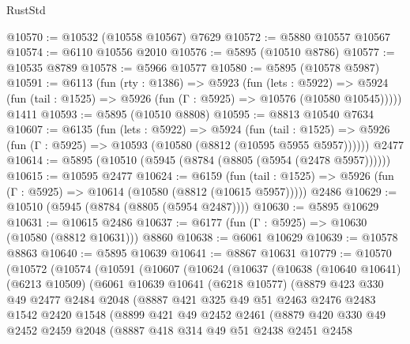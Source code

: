 \begin{lexlean}{RustStd}
\begin{coremodule}
{\begin{coremodule}
{{{{{{{{{{{{{{{{{{{{{{{{{{{{{{{{{{{@10570 := @10532 (@10558 @10567) @7629
@10572 := @5880 @10557 @10567
@10574 := @6110 @10556 @2010
@10576 := @5895 (@10510 @8786)
@10577 := @10535 @8789
@10578 := @5966 @10577
@10580 := @5895 (@10578 @5987)
@10591 := @6113
    (fun (rty : @1386) =>
    @5923
      (fun (lets : @5922) =>
      @5924 (fun (tail : @1525) => @5926 (fun (Γ : @5925) => @10576 (@10580 @10545)))))
    @1411
@10593 := @5895 (@10510 @8808)
@10595 := @8813 @10540 @7634
@10607 := @6135
    (fun (lets : @5922) =>
    @5924
      (fun (tail : @1525) =>
      @5926 (fun (Γ : @5925) => @10593 (@10580 (@8812 (@10595 @5955 @5957))))))
    @2477
@10614 := @5895 (@10510 (@5945 (@8784 (@8805 (@5954 (@2478 @5957))))))
@10615 := @10595 @2477
@10624 := @6159
    (fun (tail : @1525) => @5926 (fun (Γ : @5925) => @10614 (@10580 (@8812 (@10615 @5957)))))
    @2486
@10629 := @10510 (@5945 (@8784 (@8805 (@5954 @2487))))
@10630 := @5895 @10629
@10631 := @10615 @2486
@10637 := @6177 (fun (Γ : @5925) => @10630 (@10580 (@8812 @10631))) @8860
@10638 := @6061 @10629
@10639 := @10578 @8863
@10640 := @5895 @10639
@10641 := @8867 @10631
@10779 := @10570
    (@10572
      (@10574
        (@10591
          (@10607
            (@10624
              (@10637
                (@10638
                  (@10640 @10641)
                  (@6213 @10509)
                  (@6061
                    @10639
                    @10641
                    (@6218 @10577)
                    (@8879
                      @423
                      @330
                      @49
                      @2477
                      @2484
                      @2048
                      (@8887
                        @421
                        @325
                        @49
                        @51
                        @2463
                        @2476
                        @2483
                        @1542
                        @2420
                        @1548
                        (@8899
                          @421
                          @49
                          @2452
                          @2461
                          (@8879
                            @420
                            @330
                            @49
                            @2452
                            @2459
                            @2048
                            (@8887
                              @418
                              @314
                              @49
                              @51
                              @2438
                              @2451
                              @2458
}}}}}}}}}}}}}}}}}}}}}}}}}}}}}}}}}}}
\end{coremodule}}
\end{coremodule}
\end{lexlean}
